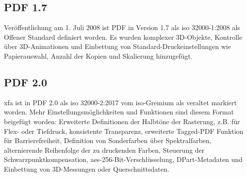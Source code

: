 \subsection{PDF 1.7}
Veröffentlichung am 1. Juli 2008 ist PDF in Version 1.7 als \gls{iso} 32000-1:2008 als Offener Standard definiert worden. Es wurden komplexer 3D-Objekte, Kontrolle über 3D-Animationen und Einbettung von Standard-Druckeinstellungen wie Papierauswahl, Anzahl der Kopien und Skalierung hinzugefügt.
\cite{proj-consult}

\subsection{PDF 2.0}
\gls{xfa} ist in PDF 2.0 als \gls{iso} 32000-2:2017 vom \gls{iso}-Gremium als veraltet markiert worden. Mehr Einstellungsmöglichkeiten und Funktionen sind diesem Format beigefügt worden: Erweiterte Definitionen der Halbtöne der Rasterung, z.B. für Flex- oder Tiefdruck, konsistente Transparenz, erweiterte Tagged-PDF Funktion für Barrierefreiheit, Definition von Sonderfarben über Spektralfarben, alternierende Reihenfolge der zu druckenden Farben, Steuerung der Schwarzpunktkompensation, \gls{aes}-256-Bit-Verschlüsselung, DPart-Metadaten und Einbettung von 3D-Messungen oder Querschnittsdaten.
\cite{proj-consult}